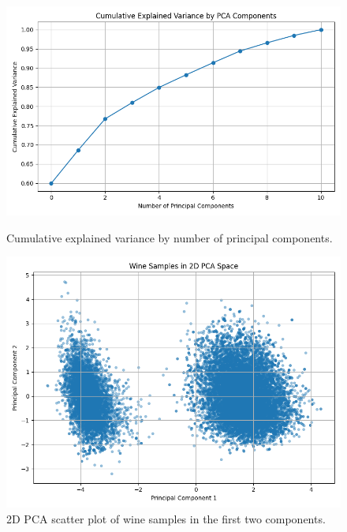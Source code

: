 \documentclass[12pt]{article}
\begin{document}
\begin{figure}[H]
    \centering
    \begin{minipage}[t]{0.48\textwidth}
        \includegraphics[width=\textwidth]{figures/pca_explained_variance.png}
        \caption{Cumulative explained variance by number of principal components.}
        \label{A}
    \end{minipage}
    \hfill
    \begin{minipage}[t]{0.48\textwidth}
        \includegraphics[width=\textwidth]{figures/pca_scatter_plot.png}
        \caption{2D PCA scatter plot of wine samples in the first two components.}
        \label{B}
    \end{minipage}
\end{figure}
\end{document}
